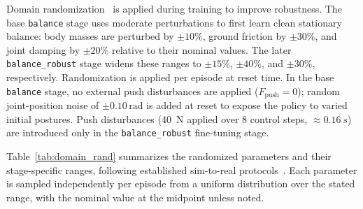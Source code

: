 \documentclass[conference]{IEEEtran}
\begin{document}
Domain randomization~\cite{tobin2017domain} is applied during training
to improve robustness.
The base \texttt{balance} stage uses moderate perturbations
to first learn clean stationary balance: body masses are perturbed by
$\pm 10\%$, ground friction by $\pm 30\%$, and joint damping by
$\pm 20\%$ relative to their nominal values.
The later \texttt{balance\_robust} stage widens these ranges to
$\pm 15\%$, $\pm 40\%$, and $\pm 30\%$, respectively.
Randomization is applied per episode at reset time.
In the base \texttt{balance} stage, no external push disturbances are applied
($F_{\mathrm{push}} = 0$);
random joint-position noise of $\pm 0.10\,\mathrm{rad}$ is added at reset
to expose the policy to varied initial postures.
Push disturbances (\SI{40}{N} applied over 8 control steps, $\approx\SI{0.16}{s}$)
are introduced only in the \texttt{balance\_robust} fine-tuning stage.

Table~\ref{tab:domain_rand} summarizes the randomized parameters and their
stage-specific ranges, following established sim-to-real protocols~\cite{tobin2017domain,peng2018simtoreal}.
Each parameter is sampled independently per episode from a uniform distribution
over the stated range, with the nominal value at the midpoint unless noted.
\end{document}
